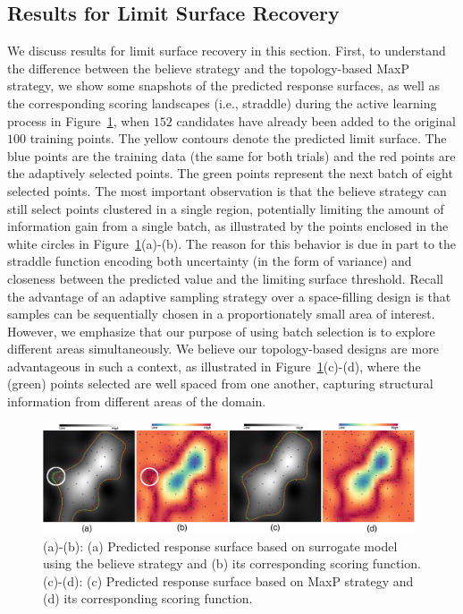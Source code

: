\subsection{Results for Limit Surface Recovery}
\label{sec:limit_results}
We discuss results for limit surface recovery in this section.
%
First, to understand the difference between the believe strategy and the topology-based MaxP strategy, we show some snapshots of the predicted response surfaces, as well as the corresponding scoring landscapes  (i.e., straddle) during the active learning process in Figure~\ref{fig:exampleLimits}, when $152$ candidates have already been added to the original $100$ training points.
%
The yellow contours denote the predicted limit surface.
%
The blue points are the training data (the same for both trials) and the red points are the adaptively selected points.
%
The green points represent the next batch of eight selected points.
%
The most important observation is that the believe strategy can still select points clustered in a single region, potentially limiting the amount of information gain from a single batch, as illustrated by the points enclosed in the white circles in Figure~\ref{fig:exampleLimits}(a)-(b).
%
The reason for this behavior is due in part to the straddle function encoding both uncertainty (in the form of variance) and closeness between the predicted value and the limiting surface threshold.
%
Recall the advantage of an adaptive sampling strategy over a space-filling design is that samples can be sequentially chosen in a proportionately small area of interest.
%
However, we emphasize that our purpose of using batch selection is to explore different areas simultaneously.
%
We believe our topology-based designs are more advantageous in such a context, as illustrated in Figure~\ref{fig:exampleLimits}(c)-(d), where the (green) points selected are well spaced from one another, capturing structural information from different areas of the domain.

\begin{figure}[!t]
\centering
\includegraphics[width=0.98\textwidth]{figs/chap5/example-limits}
\caption{(a)-(b): (a) Predicted response surface based on surrogate model using
the believe strategy and (b) its corresponding scoring function.
%
(c)-(d): (c) Predicted response surface based on MaxP strategy and (d) its
corresponding scoring function.}
\label{fig:exampleLimits}
\end{figure}


